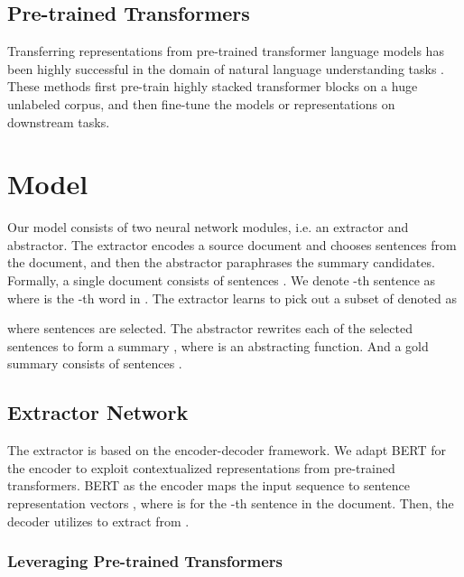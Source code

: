 \documentclass[11pt,a4paper]{article}
\begin{document}
\subsection{Pre-trained Transformers}

Transferring representations from pre-trained transformer language models
has been highly successful in the domain of natural language understanding tasks 
\cite{radford2018improving, devlin-etal-2019-bert, radford2019language, yang2019xlnet}.
These methods first pre-train highly stacked transformer blocks \cite{vaswani2017attention}
on a huge unlabeled corpus, and then fine-tune the models or representations
on downstream tasks.












\section{Model}

Our model consists of two neural network modules, i.e. an extractor and abstractor.
The extractor encodes a source document and chooses
sentences from the document, and then the abstractor
paraphrases the summary candidates.
Formally, a single document consists of  sentences .
We denote -th sentence as  where  is
the -th word in .
The extractor learns to pick out a subset of  denoted as

where  sentences are selected. The abstractor rewrites each of the selected sentences
to form a summary ,
where  is an abstracting function.
And a gold summary consists of  sentences .

\subsection{Extractor Network}

The extractor is based on the encoder-decoder framework.
We adapt BERT for the encoder to exploit contextualized
representations from pre-trained transformers. BERT as the
encoder maps the input sequence  to sentence representation
vectors ,
where  is for the -th sentence in the document.
Then, the decoder utilizes  to extract  from .

\subsubsection{Leveraging Pre-trained Transformers}
\end{document}
